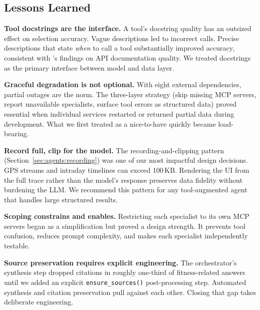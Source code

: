 \subsection{Lessons Learned}\label{sec:discussion:lessons}

\textbf{Tool docstrings are the interface.} A tool's docstring quality has an outsized effect on selection accuracy. Vague descriptions led to incorrect calls. Precise descriptions that state \textit{when} to call a tool substantially improved accuracy, consistent with \cite{patil_gorilla_2023}'s findings on API documentation quality. We treated docstrings as the primary interface between model and data layer.

\textbf{Graceful degradation is not optional.} With eight external dependencies, partial outages are the norm. The three-layer strategy (skip missing MCP servers, report unavailable specialists, surface tool errors as structured data) proved essential when individual services restarted or returned partial data during development. What we first treated as a nice-to-have quickly became load-bearing.

\textbf{Record full, clip for the model.} The recording-and-clipping pattern (Section~\ref{sec:agents:recording}) was one of our most impactful design decisions. GPS streams and intraday timelines can exceed 100\,KB. Rendering the UI from the full trace rather than the model's response preserves data fidelity without burdening the LLM. We recommend this pattern for any tool-augmented agent that handles large structured results.

\textbf{Scoping constrains and enables.} Restricting each specialist to its own MCP servers began as a simplification but proved a design strength. It prevents tool confusion, reduces prompt complexity, and makes each specialist independently testable.

\textbf{Source preservation requires explicit engineering.} The orchestrator's synthesis step dropped citations in roughly one-third of fitness-related answers until we added an explicit \texttt{ensure\_sources()} post-processing step. Automated synthesis and citation preservation pull against each other. Closing that gap takes deliberate engineering.
